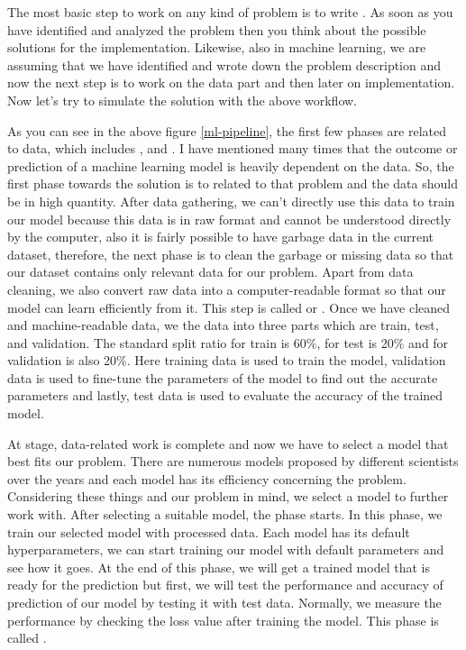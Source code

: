 \par
The most basic step to work on any kind of problem is to write . As soon as you have identified and analyzed the problem then you think about the possible solutions for the implementation. Likewise, also in machine learning, we are assuming that we have identified and wrote down the problem description and now the next step is to work on the data part and then later on implementation. Now let's try to simulate the solution with the above workflow. 
\newline
\par
As you can see in the above figure \ref{ml-pipeline}, the first few phases are related to data, which includes ,  and . I have mentioned many times that the outcome or prediction of a machine learning model is heavily dependent on the data. So, the first phase towards the solution is to  related to that problem and the data should be in high quantity. After data gathering, we can't directly use this data to train our model because this data is in raw format and cannot be understood directly by the computer, also it is fairly possible to have garbage data in the current dataset, therefore, the next phase is to clean the garbage or missing data so that our dataset contains only relevant data for our problem. Apart from data cleaning, we also convert raw data into a computer-readable format so that our model can learn efficiently from it. This step is called  or . Once we have cleaned and machine-readable data, we  the data into three parts which are train, test, and validation. The standard split ratio for train is 60\%, for test is 20\% and for validation is also 20\%. Here training data is used to train the model, validation data is used to fine-tune the parameters of the model to find out the accurate parameters and lastly, test data is used to evaluate the accuracy of the trained model.
\newline
\par
At  stage, data-related work is complete and now we have to select a model that best fits our problem. There are numerous models proposed by different scientists over the years and each model has its efficiency concerning the problem. Considering these things and our problem in mind, we select a model to further work with. After selecting a suitable model, the  phase starts. In this phase, we train our selected model with processed data. Each model has its default hyperparameters, we can start training our model with default parameters and see how it goes. At the end of this phase, we will get a trained model that is ready for the prediction but first, we will test the performance and accuracy of prediction of our model by testing it with test data. Normally, we measure the performance by checking the loss value after training the model. This phase is called .
